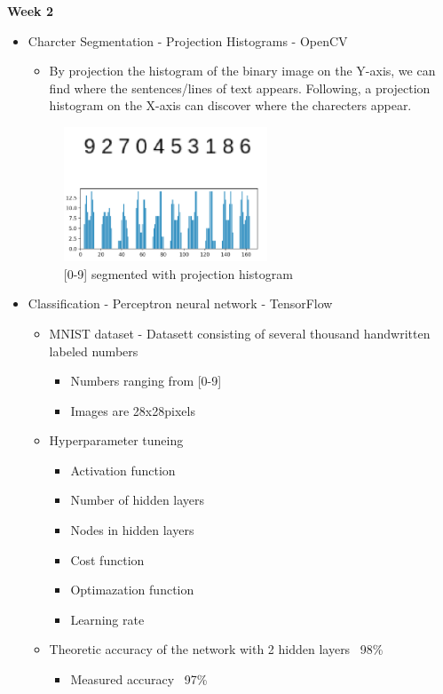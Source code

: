 \documentclass[11pt,a4paper,english]{article}
\newenvironment{loggentry}[2]%
{\noindent\textbf{#2}\marginnote{#1}\\}{\vspace{0.5cm}}
\begin{document}
\newpage
\begin{loggentry}{26.04.18}{Week 2}
\begin{itemize}
  \item{Charcter Segmentation - Projection Histograms - OpenCV}
  \begin{itemize}
    \item{By projection the histogram of the binary image on the Y-axis,
    we can find where the sentences/lines of text appears. Following, a
    projection histogram on the X-axis can discover where the charecters
    appear.}
  \end{itemize}

  \begin{figure}[H]
    \centering
    \includegraphics[height=4cm]{res/0-9_segmented_out.png}
    \caption{[0-9] segmented with projection histogram}
    \label{fig:0-9_segmented_out}
  \end{figure}

  \item{Classification - Perceptron neural network - TensorFlow}
    \begin{itemize}
      \item{MNIST dataset - Datasett consisting of several thousand handwritten
      labeled numbers}
      \begin{itemize}
        \item{Numbers ranging from [0-9]}
        \item{Images are 28x28pixels}
      \end{itemize}
      \item{Hyperparameter tuneing}
      \begin{itemize}
        \item{Activation function}
        \item{Number of hidden layers}
        \item{Nodes in hidden layers}
        \item{Cost function}
        \item{Optimazation function}
        \item{Learning rate}
      \end{itemize}
      \item{Theoretic accuracy of the network with 2 hidden layers ~98\%}
      \begin{itemize}
        \item{Measured accuracy ~97\%}


\end{itemize}
\end{itemize}
\end{itemize}
\end{loggentry}
\end{document}
